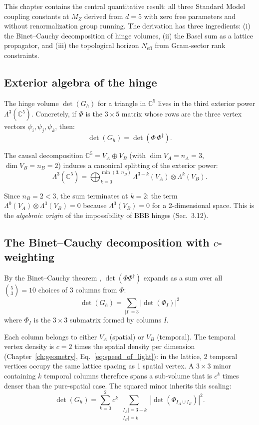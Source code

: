 \documentclass[12pt]{article}
\theoremstyle{remark}
\theoremstyle{definition}
\begin{document}
This chapter contains the central quantitative result: all three Standard Model coupling constants at $M_Z$ derived from $d = 5$ with zero free parameters and without renormalization group running. The derivation has three ingredients: (i) the Binet--Cauchy decomposition of hinge volumes, (ii) the Basel sum as a lattice propagator, and (iii) the topological horizon $N_\text{eff}$ from Gram-sector rank constraints.

\subsection{Exterior algebra of the hinge}

The hinge volume $\det(G_h)$ for a triangle in $\mathbb{C}^5$ lives in the third exterior power $\Lambda^3(\mathbb{C}^5)$. Concretely, if $\Phi$ is the $3 \times 5$ matrix whose rows are the three vertex vectors $\psi_i, \psi_j, \psi_k$, then:
\begin{equation}
\det(G_h) = \det(\Phi\,\Phi^\dagger).
\end{equation}

The causal decomposition $\mathbb{C}^5 = V_A \oplus V_B$ (with $\dim V_A = n_A = 3$, $\dim V_B = n_B = 2$) induces a canonical splitting of the exterior power:
\begin{equation}
\Lambda^3(\mathbb{C}^5) = \bigoplus_{k=0}^{\min(3,\,n_B)} \Lambda^{3-k}(V_A) \otimes \Lambda^k(V_B).
\label{eq:exterior_split}
\end{equation}

Since $n_B = 2 < 3$, the sum terminates at $k = 2$: the term $\Lambda^0(V_A) \otimes \Lambda^3(V_B) = 0$ because $\Lambda^3(V_B) = 0$ for a 2-dimensional space. This is the \emph{algebraic origin} of the impossibility of BBB hinges (Sec.~3.12).

\subsection{The Binet--Cauchy decomposition with $c$-weighting}

By the Binet--Cauchy theorem \cite{BinetCauchy}, $\det(\Phi\Phi^\dagger)$ expands as a sum over all $\binom{5}{3} = 10$ choices of 3 columns from $\Phi$:
\begin{equation}
\det(G_h) = \sum_{|I| = 3} |\det(\Phi_I)|^2
\end{equation}
where $\Phi_I$ is the $3 \times 3$ submatrix formed by columns $I$.

Each column belongs to either $V_A$ (spatial) or $V_B$ (temporal). The temporal vertex density is $c = 2$ times the spatial density per dimension (Chapter~\ref{ch:geometry}, Eq.~\ref{eq:speed_of_light}): in the lattice, 2 temporal vertices occupy the same lattice spacing as 1 spatial vertex. A $3 \times 3$ minor containing $k$ temporal columns therefore spans a sub-volume that is $c^k$ times denser than the pure-spatial case. The squared minor inherits this scaling:
\begin{equation}
\det(G_h) = \sum_{k=0}^{2} c^k \sum_{\substack{|I_A| = 3-k \\ |I_B| = k}} |\det(\Phi_{I_A \cup I_B})|^2.
\label{eq:BC_expansion}
\end{equation}
\end{document}
